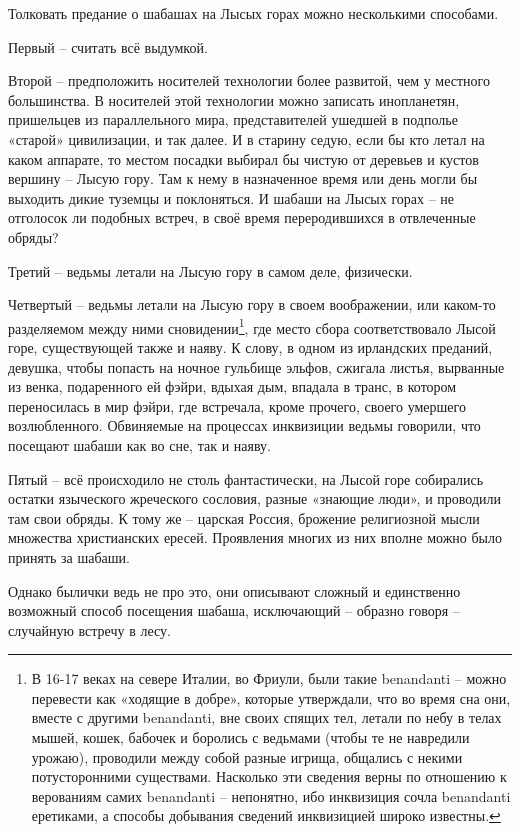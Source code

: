 Толковать предание о шабашах на Лысых горах можно несколькими способами.

Первый – считать всё выдумкой. 

Второй – предположить носителей технологии более развитой, чем у местного большинства. В носителей этой технологии можно записать инопланетян, пришельцев из параллельного мира, представителей ушедшей в подполье «старой» цивилизации, и так далее. И в старину седую, если бы кто летал на каком аппарате, то местом посадки выбирал бы чистую от деревьев и кустов вершину – Лысую гору. Там к нему в назначенное время или день могли бы выходить дикие туземцы и поклоняться. И шабаши на Лысых горах – не отголосок ли подобных встреч, в своё время переродившихся в отвлеченные обряды? 

Третий – ведьмы летали на Лысую гору в самом деле, физически.

Четвертый – ведьмы летали на Лысую гору в своем воображении, или каком-то разделяемом между ними сновидении\footnote{В 16-17 веках на севере Италии, во Фриули, были такие benandanti – можно перевести как «ходящие в добре», которые утверждали, что во время сна они, вместе с другими benandanti, вне своих спящих тел, летали по небу в телах мышей, кошек, бабочек и боролись с ведьмами (чтобы те не навредили урожаю), проводили между собой разные игрища, общались с некими потусторонними существами. Насколько эти сведения верны по отношению к верованиям самих benandanti – непонятно, ибо инквизиция сочла benandanti еретиками, а способы добывания сведений инквизицией широко известны.}, где место сбора соответствовало Лысой горе, существующей также и наяву. К слову, в одном из ирландских преданий, девушка, чтобы попасть на ночное гульбище эльфов, сжигала листья, вырванные из венка, подаренного ей фэйри,  вдыхая дым, впадала в транс, в котором переносилась в мир фэйри, где встречала, кроме прочего, своего умершего возлюбленного\cite{wilde01}. Обвиняемые на процессах инквизиции ведьмы говорили, что посещают шабаши как во сне, так и наяву.

Пятый – всё происходило не столь фантастически, на Лысой горе собирались остатки языческого жреческого сословия, разные «знающие люди», и проводили там свои обряды. К тому же – царская Россия, брожение религиозной мысли множества христианских ересей. Проявления многих из них вполне можно было принять за шабаши.

Однако былички ведь не про это, они описывают сложный и единственно возможный способ посещения шабаша, исключающий – образно говоря – случайную встречу в лесу.


